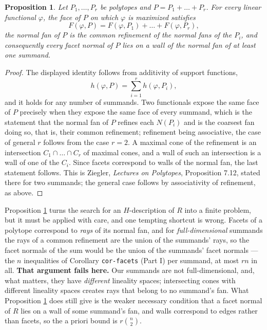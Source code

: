 \documentclass[11pt, a4paper, abstract=yes]{scrartcl}
\theoremstyle{definition}
\theoremstyle{remark}
\theoremstyle{plain}
\newtheorem{proposition}[definition]{Proposition}
\begin{document}
\begin{proposition}
Let \(P_1,\dots,P_r\) be polytopes and \(P=P_1+\dots+P_r\). For every linear functional \(\varphi\),
the face of \(P\) on which \(\varphi\) is maximized satisfies
\[
  F(\varphi,P)=F(\varphi,P_1)+\dots+F(\varphi,P_r),
\]
the normal fan of \(P\) is the common refinement of the normal fans of the \(P_i\), and consequently
every facet normal of \(P\) lies on a wall of the normal fan of at least one summand.
\label{orgef6f203}
\end{proposition}

\begin{proof}
The displayed identity follows from additivity of support functions,
\[
  h(\varphi,P)=\sum_{i=1}^{r} h(\varphi,P_i),
\]
and it holds for any number of summands. Two functionals expose
the same face of \(P\) precisely when they expose the same face of every summand, which is the
statement that the normal fan of \(P\) refines each \(N(P_i)\) and is the coarsest fan doing so, that
is, their common refinement; refinement being associative, the case of general \(r\) follows from the
case \(r=2\). A maximal cone of the refinement is an intersection \(C_1\cap\dots\cap C_r\) of maximal
cones, and a wall of such an intersection is a wall of one of the \(C_i\). Since facets correspond to
walls of the normal fan, the last statement follows. This is Ziegler, \emph{Lectures on Polytopes}, Proposition 7.12, stated there for two summands; the general case follows by associativity of refinement, as above.
\end{proof}

Proposition \ref{orgef6f203} turns the search for an \(H\)-description of \(R\) into a finite problem,
but it must be applied with care, and one tempting shortcut is wrong. Facets of a polytope correspond
to \emph{rays} of its normal fan, and for \emph{full-dimensional} summands the rays of a common refinement are
the union of the summands' rays, so the facet normals of the sum would be the union of the summands'
facet normals --- the \(n\) inequalities of Corollary \texttt{cor-facets} (Part I) per summand, at most \(rn\) in all.
\textbf{That argument fails here.} Our summands are not full-dimensional, and, what matters, they have
\emph{different} lineality spaces; intersecting cones with different lineality spaces creates rays that
belong to no summand's fan. What Proposition \ref{orgef6f203} does still give is the weaker necessary
condition that a facet normal of \(R\) lies on a wall of some summand's fan, and walls correspond to
edges rather than facets, so the a priori bound is \(r\binom n2\).
\end{document}
